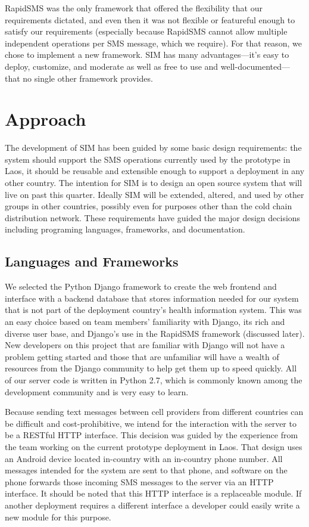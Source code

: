 \documentclass{acm_proc_article-sp}
\begin{document}
RapidSMS was the only framework that offered the flexibility that our requirements dictated, and even then it was not flexible or featureful enough to satisfy our requirements (especially because RapidSMS cannot allow multiple independent operations per SMS message, which we require). For that reason, we chose to implement a new framework. SIM has many advantages---it's easy to deploy, customize, and moderate as well as free to use and well-documented---that no single other framework provides.

\section{Approach}

The development of SIM has been guided by some basic design requirements: the system should support the SMS operations currently used by the prototype in Laos, it should be reusable and extensible enough to support a deployment in any other country. The intention for SIM is to design an open source system that will live on past this quarter. Ideally SIM will be extended, altered, and used by other groups in other countries, possibly even for purposes other than the cold chain distribution network. These requirements have guided the major design decisions including programing languages, frameworks, and documentation.

\subsection{Languages and Frameworks}

We selected the Python Django framework to create the web frontend and interface with a backend database that stores information needed for our system that is not part of the deployment country’s health information system. This was an easy choice based on team members’ familiarity with Django, its rich and diverse user base, and Django’s use in the  RapidSMS framework (discussed later). New developers on this project that are familiar with Django will not have a problem getting started and those that are unfamiliar will have a wealth of resources from the Django community to help get them up to speed quickly. All of our server code is written in Python 2.7, which is commonly known among the development community and is very easy to learn. 
 
Because sending text messages between cell providers from different countries can be difficult and cost-prohibitive, we intend for the interaction with the server to be a RESTful HTTP interface. This decision was guided by the experience from the team working on the current prototype deployment in Laos. That design uses an Android device located in-country with an in-country phone number. All messages intended for the system are sent to that phone, and software on the phone forwards those incoming SMS messages to the server via an HTTP interface. It should be noted that this HTTP interface is a replaceable module. If another deployment requires a different interface a developer could easily write a new module for this purpose. 
\end{document}
